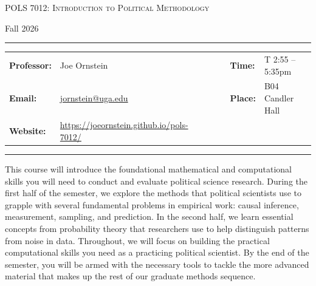 \documentclass[11pt, letterpaper]{article}
\begin{document}
\begin{center}
{\Large \textsc{POLS 7012: Introduction to Political Methodology}}
\end{center}
\begin{center}
{\large Fall 2026}
\end{center}

\begin{center}
\rule{6.5in}{0.4pt}
\begin{minipage}[t]{.96\textwidth}
\begin{tabular}{llcccll}
\textbf{Professor:} & Joe Ornstein & & &  & \textbf{Time:} & T 2:55 -- 5:35pm \\
\textbf{Email:} &  \href{mailto:jornstein@uga.edu}{jornstein@uga.edu} & & & & \textbf{Place:} & B04 Candler Hall\\
\textbf{Website:} & \href{https://joeornstein.github.io/pols-7012/}{https://joeornstein.github.io/pols-7012/} & & & & &
\end{tabular}
\end{minipage}
\rule{6.5in}{0.4pt}
\end{center}
\vspace{.15cm}
\setlength{\unitlength}{1in}
\renewcommand{\arraystretch}{2}



\noindent This course will introduce the foundational mathematical and computational skills you will need to conduct and evaluate political science research. During the first half of the semester, we explore the methods that political scientists use to grapple with several fundamental problems in empirical work: causal inference, measurement, sampling, and prediction. In the second half, we learn essential concepts from probability theory that researchers use to help distinguish patterns from noise in  data. Throughout, we will focus on building the practical computational skills you need as a practicing political scientist. By the end of the semester, you will be armed with the necessary tools to tackle the more advanced material that makes up the rest of our graduate methods sequence. %
\end{document}
